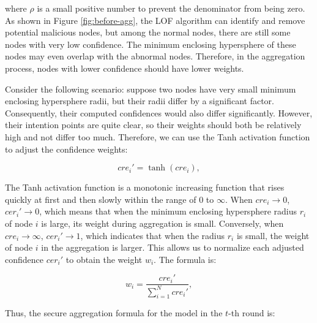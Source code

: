 \documentclass[lettersize,journal]{IEEEtran}
\begin{document}

where $\rho$ is a small positive number to prevent the denominator from being zero. 
As shown in Figure \ref{fig:before-agg}, the LOF algorithm can identify and remove potential malicious nodes, but among the normal nodes, there are still some nodes with very low confidence. The minimum enclosing hypersphere of these nodes may even overlap with the abnormal nodes. Therefore, in the aggregation process, nodes with lower confidence should have lower weights.

Consider the following scenario: suppose two nodes have very small minimum enclosing hypersphere radii, but their radii differ by a significant factor. Consequently, their computed confidences would also differ significantly. However, their intention points are quite clear, so their weights should both be relatively high and not differ too much. Therefore, we can use the Tanh activation function to adjust the confidence weights:

\begin{equation}
    cre_i'=\tanh(cre_i),
\end{equation}

The Tanh activation function is a monotonic increasing function that rises quickly at first and then slowly within the range of $0$ to $\infty$. When $cre_i \to 0$, $cer_i' \to 0$, which means that when the minimum enclosing hypersphere radius $r_i$ of node $i$ is large, its weight during aggregation is small. Conversely, when $cre_i \to \infty$, $cer_i' \to 1$, which indicates that when the radius $r_i$ is small, the weight of node $i$ in the aggregation is larger. This allows us to normalize each adjusted confidence $cer_i'$ to obtain the weight $w_i$. The formula is:

\begin{equation}
    w_i=\frac{cre_i'}{\sum_{i=1}^{N}cre_i'},
\end{equation}

Thus, the secure aggregation formula for the model in the $t$-th round is:
\end{document}
